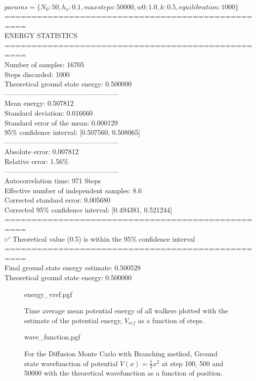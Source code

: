 \documentclass[reqno]{amsart}
\numberwithin{equation}{section}
\numberwithin{figure}{section}
\begin{document}
$params = \{N_0: 50, h_x: 0.1, maxsteps: 50000, w0: 1.0, k: 0.5, equilibration: 1000\}$ \\
==================================================\\
ENERGY STATISTICS\\
==================================================\\
Number of samples: 16705\\
Steps discarded: 1000\\
Theoretical ground state energy: 0.500000\\
--------------------------------------------------\\
Mean energy: 0.507812\\
Standard deviation: 0.016660\\
Standard error of the mean: 0.000129\\
95\% confidence interval: [0.507560, 0.508065]\\
--------------------------------------------------\\
Absolute error: 0.007812\\
Relative error: 1.56\%\\
--------------------------------------------------\\
Autocorrelation time: 971 Steps\\
Effective number of independent samples: 8.6\\
Corrected standard error: 0.005680\\
Corrected 95\% confidence interval: [0.494381, 0.521244]\\
==================================================\\
✅ Theoretical value (0.5) is within the 95\% confidence interval\\
==================================================\\
Final ground state energy estimate: 0.500528\\
Theoretical ground state energy: 0.500000\\

\begin{figure}[h]
    \centering
    {energy_vref.pgf}
    \caption{Time average mean potential energy of all walkers plotted with the estimate of the potential energy, $V_{ref}$ as a function of steps.}
    \label{fig:energy_vref}
\end{figure}

\begin{figure}[h]
    \centering
    {wave_function.pgf}
    \caption{For the Diffusion Monte Carlo with Branching method, Ground state wavefunction of potential $V(x) = \frac{1}{2}x^2$ at step 100, 500 and 50000 with the theoretical wavefunction as a function of position.}
    \label{fig:energy_vs_time}
\end{figure}
\end{document}
